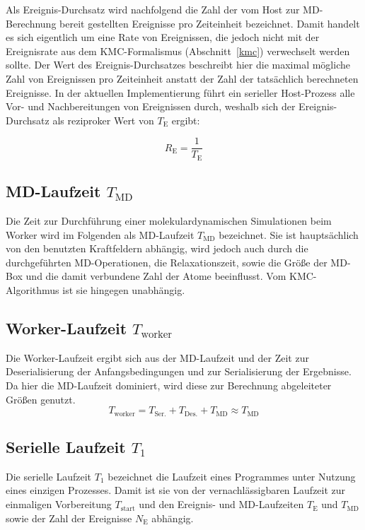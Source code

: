 Als Ereignis-Durchsatz wird nachfolgend die Zahl der vom Host zur MD-Berechnung bereit gestellten Ereignisse pro Zeiteinheit bezeichnet.
Damit handelt es sich eigentlich um eine Rate von Ereignissen, die jedoch nicht mit der Ereignisrate aus dem KMC-Formalismus (Abschnitt~\ref{kmc}) verwechselt werden sollte.
Der Wert des Ereignis-Durchsatzes beschreibt hier die maximal mögliche Zahl von Ereignissen pro Zeiteinheit anstatt der Zahl der tatsächlich berechneten Ereignisse.
In der aktuellen Implementierung führt ein serieller Host-Prozess alle Vor- und Nachbereitungen von Ereignissen durch, weshalb sich der Ereignis-Durchsatz als reziproker Wert von $T_\text{E}$ ergibt:

\begin{equation}
  R_\text{E} = \frac{1}{T_\text{E}}
\end{equation}

\subsection{MD-Laufzeit $T_\text{MD}$}

Die Zeit zur Durchführung einer molekulardynamischen Simulationen beim Worker wird im Folgenden als MD-Laufzeit $T_\text{MD}$ bezeichnet.
Sie ist hauptsächlich von den benutzten Kraftfeldern abhängig, wird jedoch auch durch die durchgeführten MD-Operationen, die Relaxationszeit, sowie die Größe der MD-Box und die damit verbundene Zahl der Atome beeinflusst.
Vom KMC-Algorithmus ist sie hingegen unabhängig.

\subsection{Worker-Laufzeit $T_\text{worker}$}

Die Worker-Laufzeit ergibt sich aus der MD-Laufzeit und der Zeit zur Deserialisierung der Anfangsbedingungen und zur Serialisierung der Ergebnisse.
Da hier die MD-Laufzeit dominiert, wird diese zur Berechnung abgeleiteter Größen genutzt.
\begin{equation}
  T_\text{worker} = T_\text{Ser.} + T_\text{Des.} + T_\text{MD} \approx T_\text{MD}
\end{equation}

\subsection{Serielle Laufzeit $T_1$}

Die serielle Laufzeit $T_1$ bezeichnet die Laufzeit eines Programmes unter Nutzung eines einzigen Prozesses.
Damit ist sie von der vernachlässigbaren Laufzeit zur einmaligen Vorbereitung $T_\text{start}$ und den Ereignis- und MD-Laufzeiten $T_\text{E}$ und $T_\text{MD}$ sowie der Zahl der Ereignisse $N_\text{E}$ abhängig.

